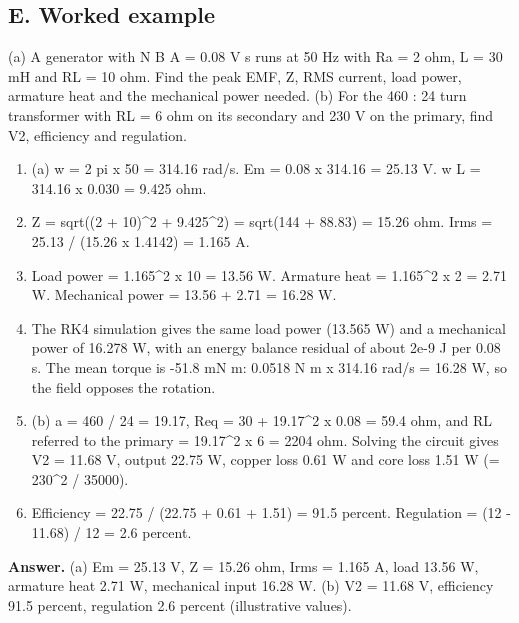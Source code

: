 \documentclass[11pt,a4paper]{article}
\begin{document}
\subsection*{E. Worked example}
(a) A generator with N B A = 0.08 V s runs at 50 Hz with Ra = 2 ohm, L = 30 mH and RL = 10 ohm. Find the peak EMF, Z, RMS current, load power, armature heat and the mechanical power needed. (b) For the 460 : 24 turn transformer with RL = 6 ohm on its secondary and 230 V on the primary, find V2, efficiency and regulation.
\begin{enumerate}[nosep]
\item (a) w = 2 pi x 50 = 314.16 rad/s. Em = 0.08 x 314.16 = 25.13 V. w L = 314.16 x 0.030 = 9.425 ohm.
\item Z = sqrt((2 + 10)\textasciicircum{}2 + 9.425\textasciicircum{}2) = sqrt(144 + 88.83) = 15.26 ohm. Irms = 25.13 / (15.26 x 1.4142) = 1.165 A.
\item Load power = 1.165\textasciicircum{}2 x 10 = 13.56 W. Armature heat = 1.165\textasciicircum{}2 x 2 = 2.71 W. Mechanical power = 13.56 + 2.71 = 16.28 W.
\item The RK4 simulation gives the same load power (13.565 W) and a mechanical power of 16.278 W, with an energy balance residual of about 2e-9 J per 0.08 s. The mean torque is -51.8 mN m: 0.0518 N m x 314.16 rad/s = 16.28 W, so the field opposes the rotation.
\item (b) a = 460 / 24 = 19.17, Req = 30 + 19.17\textasciicircum{}2 x 0.08 = 59.4 ohm, and RL referred to the primary = 19.17\textasciicircum{}2 x 6 = 2204 ohm. Solving the circuit gives V2 = 11.68 V, output 22.75 W, copper loss 0.61 W and core loss 1.51 W (= 230\textasciicircum{}2 / 35000).
\item Efficiency = 22.75 / (22.75 + 0.61 + 1.51) = 91.5 percent. Regulation = (12 - 11.68) / 12 = 2.6 percent.
\end{enumerate}
\textbf{Answer.} (a) Em = 25.13 V, Z = 15.26 ohm, Irms = 1.165 A, load 13.56 W, armature heat 2.71 W, mechanical input 16.28 W. (b) V2 = 11.68 V, efficiency 91.5 percent, regulation 2.6 percent (illustrative values).
\end{document}
